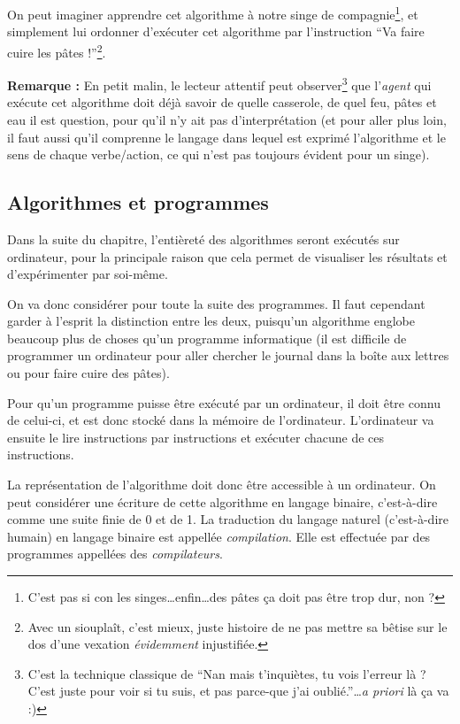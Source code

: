 \documentclass[../../main.tex]{subfiles}
\begin{document}
On peut imaginer apprendre cet algorithme à notre singe de compagnie\footnote{C'est pas si con les singes\dots enfin\dots des pâtes ça doit pas être trop dur, non ?}, et simplement lui ordonner d'exécuter cet algorithme par l'instruction ``Va faire cuire les pâtes !''\footnote{Avec un siouplaît, c'est mieux, juste histoire de ne pas mettre sa bêtise sur le dos d'une vexation \textit{évidemment} injustifiée.}.

\textbf{Remarque :} En petit malin, le lecteur attentif peut observer\footnote{C'est la technique classique de ``Nan mais t'inquiètes, tu vois l'erreur là ? C'est juste pour voir si tu suis, et pas parce-que j'ai oublié.''\dots \textit{a priori} là ça va :)} que l'\textit{agent} qui exécute cet algorithme doit déjà savoir de quelle casserole, de quel feu, pâtes et eau il est question, pour qu'il n'y ait pas d'interprétation (et pour aller plus loin, il faut aussi qu'il comprenne le langage dans lequel est exprimé l'algorithme et le sens de chaque verbe/action, ce qui n'est pas toujours évident pour un singe).
\subsection{Algorithmes et programmes} \label{sub:algorithmes_et_programmes}

Dans la suite du chapitre, l'entièreté des algorithmes seront exécutés sur ordinateur, pour la principale raison que cela permet de visualiser les résultats et d'expérimenter par soi-même.

On va donc considérer pour toute la suite des programmes. Il faut cependant garder à l'esprit la distinction entre les deux, puisqu'un algorithme englobe beaucoup plus de choses qu'un programme informatique (il est difficile de programmer un ordinateur pour aller chercher le journal dans la boîte aux lettres ou pour faire cuire des pâtes).

Pour qu'un programme puisse être exécuté par un ordinateur, il doit être connu de celui-ci, et est donc stocké dans la mémoire de l'ordinateur. L'ordinateur va ensuite le lire instructions par instructions et exécuter chacune de ces instructions.

La représentation de l'algorithme doit donc être accessible à un ordinateur. On peut considérer une écriture de cette algorithme en langage binaire, c'est-à-dire comme une suite finie de 0 et de 1. La traduction du langage naturel (c'est-à-dire humain) en langage binaire est appellée \textit{compilation}. Elle est effectuée par des programmes appellées des \textit{compilateurs}.
\end{document}
